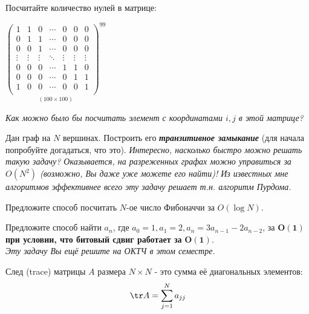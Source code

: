 	\begin{problem}{
		Посчитайте количество нулей в матрице: \\
			\centerline{
				$\underset{(100 \times 100)}{\begin{pmatrix}
					1 & 1 & 0 & \cdots & 0 & 0 & 0 \\
					0 & 1 & 1 & \cdots & 0 & 0 & 0 \\
					0 & 0 & 1 & \cdots & 0 & 0 & 0 \\
					\vdots & \vdots & \vdots  & \ddots & \vdots & \vdots & \vdots \\
					0 & 0 & 0 & \cdots & 1 & 1 & 0 \\
					0 & 0 & 0 & \cdots & 0 & 1 & 1 \\
					1 & 0 & 0 & \cdots & 0 & 0 & 1  \\
				\end{pmatrix}^{99}}$
			}
		\textit{Как можно было бы посчитать элемент с координатами $i, j$ в этой матрице?}
		
	}\end{problem}

	\begin{problem}
		Дан граф на $N$ вершинах. Построить его \textit{\textbf{транзитивное замыкание}} (для начала попробуйте догадаться, что это).
		\textit{Интересно, насколько быстро можно решать такую задачу? Оказывается, на разреженных графах можно управиться за $O(N^2)$ (возможно, Вы даже уже можете его найти)! Из известных мне алгоритмов эффективнее всего эту задачу решает т.н. алгоритм Пурдома.} 
	\end{problem}


	\begin{problem}
		Предложите способ посчитать $N$-ое число Фибоначчи за $O(\log N)$. 	
	\end{problem}
	
	\begin{problem}
		Предложите способ найти $a_n$, где $a_0 = 1, a_1 = 2, a_n = 3a_{n-1} - 2a_{n-2}$, за $\mathbf{O(1)}$ \textbf{при условии, что битовый сдвиг работает за} $\mathbf{O(1)}$.
		\\
		\textit{Эту задачу Вы ещё решите на ОКТЧ в этом семестре.}
	\end{problem}

	
	\begin{definition}
		След (trace) матрицы $A$ размера $N \times N$ - это сумма её диагональных элементов: 
		$$ \tr A = \sum_{j=1}^{N} a_{jj}$$
	\end{definition}

